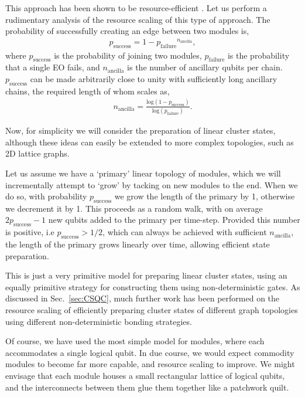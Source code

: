 \documentclass[aps,rmp,twocolumn,amsmath,amssymb,nofootinbib,superscriptaddress,longbibliography,floatfix]{revtex4-1}
\begin{document}
This approach has been shown to be resource-efficient \cite{bib:Nielsen04}. Let us perform a rudimentary analysis of the resource scaling of this type of approach. The probability of successfully creating an edge between two modules is,
\begin{align}
p_\mathrm{success} = 1 - {p_\mathrm{failure}}^{n_\mathrm{ancilla}},
\end{align}
where $p_\mathrm{success}$ is the probability of joining two modules, $p_\mathrm{failure}$ is the probability that a single EO fails, and $n_\mathrm{ancilla}$ is the number of ancillary qubits per chain. $p_\mathrm{success}$ can be made arbitrarily close to unity with sufficiently long ancillary chains, the required length of whom scales as,
\begin{align}
n_\mathrm{ancilla} = \frac{\mathrm{log}(1-p_\mathrm{success})}{\mathrm{log}(p_\mathrm{failure})}.
\end{align}

Now, for simplicity we will consider the preparation of linear cluster states, although these ideas can easily be extended to more complex topologies, such as 2D lattice graphs.

Let us assume we have a `primary' linear topology of modules, which we will incrementally attempt to `grow' by tacking on new modules to the end. When we do so, with probability $p_\mathrm{success}$ we grow the length of the primary by 1, otherwise we decrement it by 1. This proceeds as a random walk, with on average \mbox{$2p_\mathrm{success}-1$} new qubits added to the primary per time-step. Provided this number is positive, i.e \mbox{$p_\mathrm{success}>1/2$}, which can always be achieved with sufficient $n_\mathrm{ancilla}$, the length of the primary grows linearly over time, allowing efficient state preparation.

This is just a very primitive model for preparing linear cluster states, using an equally primitive strategy for constructing them using non-deterministic gates. As discussed in Sec.~\ref{sec:CSQC}, much further work has been performed on the resource scaling of efficiently preparing cluster states of different graph topologies using different non-deterministic bonding strategies.

Of course, we have used the most simple model for modules, where each accommodates a single logical qubit. In due course, we would expect commodity modules to become far more capable, and resource scaling to improve. We might envisage that each module houses a small rectangular lattice of logical qubits, and the interconnects between them glue them together like a patchwork quilt.
\end{document}
